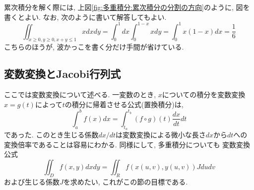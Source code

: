         累次積分を解く際には, 上図\ref{fig:多重積分:累次積分の分割の方向}のように, 図を書くとよい. なお, 次のように書いて解答してもよい.
        \begin{equation*}
            \iint_{x\geq0,y\geq0,x+y\leq 1}xdxdy=\int_0^1dx\int_{0}^{1-x}xdy=\int_{0}^{1}x(1-x)dx=\frac{1}{6}
        \end{equation*}
        こちらのほうが, 波かっこを書く分だけ手間が省けている.
    \clearpage
    \subsection{変数変換とJacobi行列式}
        ここでは変数変換について述べる. 一変数のとき, $x$についての積分を変数変換$x=g(t)$によって$t$の積分に帰着させる公式(置換積分)は, 
        \begin{equation}
            \int_{a}^{b}f(x)dx=\int_{t_a}^{t_b}(f\circ g)(t)\frac{dx}{dt}dt
        \end{equation}
        であった. このとき生じる係数$dx/dt$は変数変換による微小な長さ$dx$から$dt$への変換倍率であることは容易にわかる. 同様にして, 多重積分についても
        変数変換公式
        \begin{equation*}
            \iint_D f(x,y)dxdy=\iint_R f(x(u,v),y(u,v))Jdudv
        \end{equation*}
        および生じる係数$J$を求めたい, これがこの節の目標である.

